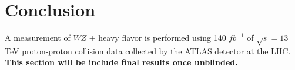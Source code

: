 \documentclass[NOTE, atlasdraft=true, texlive=2016, UKenglish]{\ATLASLATEXPATH atlasdoc}
\begin{document}







\section{Conclusion}
\label{sec:conclusion}

A measurement of $WZ$ + heavy flavor is performed using 140 $fb^{-1}$ of $\sqrt{s} = 13$ TeV proton-proton collision data collected by the ATLAS detector at the LHC. \textbf{This section will be include final results once unblinded.}%

\printbibliography
%
%
\end{document}
